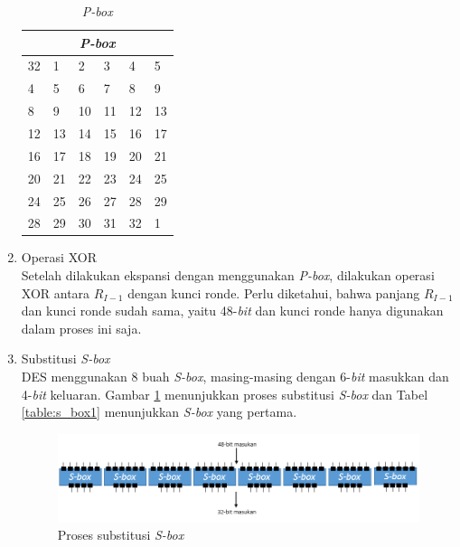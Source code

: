 \begin{enumerate}
\begin{table}[H]
	\begin{center}
		\begin{tabular}{|l|l|l|l|l|l|}
				\hline
				\multicolumn{6}{|c|}{\textit{P-box}} \\
				\hline
				32 	& 1		& 2 	& 3 	& 4 	& 5		\\ \hline
				4 	& 5		& 6 	& 7 	& 8 	& 9		\\ \hline
				8 	& 9		& 10 	& 11 	& 12 	& 13	\\ \hline
				12 	& 13	& 14 	& 15 	& 16 	& 17	\\ \hline
				16 	& 17	& 18 	& 19 	& 20 	& 21	\\ \hline
				20 	& 21	& 22 	& 23 	& 24 	& 25	\\ \hline
				24 	& 25	& 26 	& 27 	& 28 	& 29	\\ \hline
				28 	& 29	& 30 	& 31 	& 32 	& 1		\\ \hline
		\end{tabular}
	\end{center}
	\caption{\textit{P-box}}\label{table:Pbox}
\end{table}

	\item Operasi XOR\\
	Setelah dilakukan ekspansi dengan menggunakan \textit{P-box}, dilakukan operasi XOR antara \begin{math}R_{I-1}\end{math} dengan kunci ronde. Perlu diketahui, bahwa panjang \begin{math}R_{I-1}\end{math} dan kunci ronde sudah sama, yaitu 48-\textit{bit} dan kunci ronde hanya digunakan dalam proses ini saja.

	\item Substitusi \textit{S-box}\\
	DES menggunakan 8 buah \textit{S-box}, masing-masing dengan 6-\textit{bit} masukkan dan 4-\textit{bit} keluaran. Gambar \ref{fig:substitusi_s_box} menunjukkan proses substitusi \textit{S-box} dan Tabel \ref{table:s_box1} menunjukkan \textit{S-box} yang pertama.
	
\begin{figure}[H]
	\includegraphics[scale=0.5]{Gambar/S-box}
	\centering
	\caption{Proses substitusi \textit{S-box}}\label{fig:substitusi_s_box}
\end{figure}


\end{enumerate}

